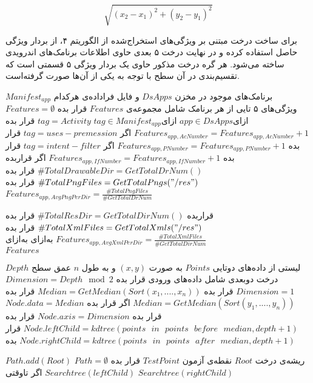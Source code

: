 \begin{equation}
	\sqrt{(x_{2}-x_{1})^2 + (y_{2}-y_{1})^2}
\end{equation}

برای ساخت درخت مبتنی بر ویژگی‌های استخراج‌شده از الگوریتم ۴، از بردار ویژگی حاصل استفاده کرده و در نهایت درخت ۵ بعدی حاوی اطلاعات برنامک‌های اندرویدی ساخته می‌شود. هر گره درخت مذکور حاوی یک بردار ویژگی ۵ قسمتی است که تقسیم‌بندی در آن‌ سطح با توجه به یکی از آن‌‌‌ها صورت گرفته‌‌است.

 برنامک‌های موجود در مخزن $DsApps$ و فایل فراداده‌ی هرکدام‌ $Manifest_{app}$
 ویژگی‌های ۵ تایی از هر برنامک شامل مجموعه‌ی $Features$
 قرار بده $Features=\emptyset$
‌ازای{$app \in  DsApps$} 
‌ازای{$tag \in Manifest_{app}$}
 $tag=Activity$
 قرار بده $Features_{app,AcNumber} =Features_{app,AcNumber} + 1 $
‌اگر
 $tag=uses-premession$
 قرار بده $Features_{app,PNumber} =Features_{app,PNumber} + 1 $
‌اگر
 $tag=intent-filter$
 قرار بده $Features_{app,IfNumber} =Features_{app,IfNumber} + 1 $
‌اگر
 قرار‌بده $\#TotalDrawableDir = GetTotalDrNum()$
 قرار بده $\#TotalPngFiles = GetTotalPngs("/res")$
 قرار بده $Features_{app,AvgPngPerDir}=  \frac{\#TotalPngFiles}{\#GetTotalDrNum}$

 قرار‌بده $\#TotalResDir = GetTotalDirNum()$
 قرار بده $\#TotalXmlFiles = GetTotalXmls("/res")$
 قرار بده $Features_{app,AvgXmlPerDir}=  \frac{\#TotalXmlFiles}{\#GetTotalDirNum}$
‌به‌ازای
‌به‌ازای\\
 $Features$



 لیستی از داده‌های دوتایی $Points$ به صورت $(x,y)$ و به طول $n$ 
 عمق سطح $Depth$
 درخت دو‌بعدی شامل داده‌های ورودی
 قرار بده 
$Dimension=Depth \mod 2$
 $Dimension=1$
 قرار بده $Median=GetMedian(Sort(x_{1},....,x_{n}))$
 قرار‌ بده
$Median=GetMedian(Sort(y_{1},....,y_{n}))$
‌اگر
 قرار بده $Node.data=Median$
 قرار بده $Node.axis=Dimension$
 قرار بده
 $Node.leftChild = kdtree(points \:\:\: in \:\:\: points \:\:\: before \:\:\: median, depth+1)$
  قرار بده
 $Node.rightChild = kdtree(points \:\:\: in \:\:\: points \:\:\: after \:\:\: median, depth+1)$



 ریشه‌ی درخت $Root$ 
 نقطه‌ی آزمون $TestPoint$
 قرار‌ بده $Path=\emptyset$
 $Path.add(Root)$
 $Searchtree(rightChild)$
 $Searchtree(leftChild)$
‌اگر
‌تاوقتی













